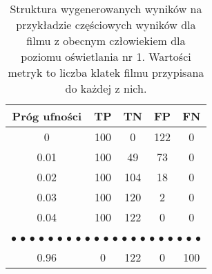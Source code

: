 \begin{table}[H]
    \centering
    \caption{Struktura wygenerowanych wyników na przykładzie częściowych wyników dla filmu z obecnym człowiekiem dla poziomu oświetlania nr 1. Wartości metryk to liczba klatek filmu przypisana do każdej z nich.}
    \begin{tabular}{ccccc}
    \hline
    \multicolumn{1}{|c|}{Próg   ufności} & \multicolumn{1}{c|}{TP}                    & \multicolumn{1}{c|}{TN}                    & \multicolumn{1}{c|}{FP}                    & \multicolumn{1}{c|}{FN}                    \\ \hline
    \multicolumn{1}{|c|}{0}                                 & \multicolumn{1}{c|}{100}                   & \multicolumn{1}{c|}{0}                     & \multicolumn{1}{c|}{122}                   & \multicolumn{1}{c|}{0}                     \\ \hline
    \multicolumn{1}{|c|}{0.01}                              & \multicolumn{1}{c|}{100}                   & \multicolumn{1}{c|}{49}                    & \multicolumn{1}{c|}{73}                    & \multicolumn{1}{c|}{0}                     \\ \hline
    \multicolumn{1}{|c|}{0.02}                              & \multicolumn{1}{c|}{100}                   & \multicolumn{1}{c|}{104}                   & \multicolumn{1}{c|}{18}                    & \multicolumn{1}{c|}{0}                     \\ \hline
    \multicolumn{1}{|c|}{0.03}                              & \multicolumn{1}{c|}{100}                   & \multicolumn{1}{c|}{120}                   & \multicolumn{1}{c|}{2}                     & \multicolumn{1}{c|}{0}                     \\ \hline
    \multicolumn{1}{|c|}{0.04}                              & \multicolumn{1}{c|}{100}                   & \multicolumn{1}{c|}{122}                   & \multicolumn{1}{c|}{0}                     & \multicolumn{1}{c|}{0}                     \\ \hline
    \multicolumn{5}{c}{$\bullet$ $\bullet$   $\bullet$ $\bullet$ $\bullet$ $\bullet$ $\bullet$ $\bullet$ $\bullet$   $\bullet$ $\bullet$ $\bullet$ $\bullet$ $\bullet$ $\bullet$ $\bullet$   $\bullet$ $\bullet$ $\bullet$ $\bullet$ $\bullet$} \\ \hline
    \multicolumn{1}{|c|}{0.96}                              & \multicolumn{1}{c|}{0}                     & \multicolumn{1}{c|}{122}                   & \multicolumn{1}{c|}{0}                     & \multicolumn{1}{c|}{100}                   \\ \hline

\end{tabular}
\end{table}
